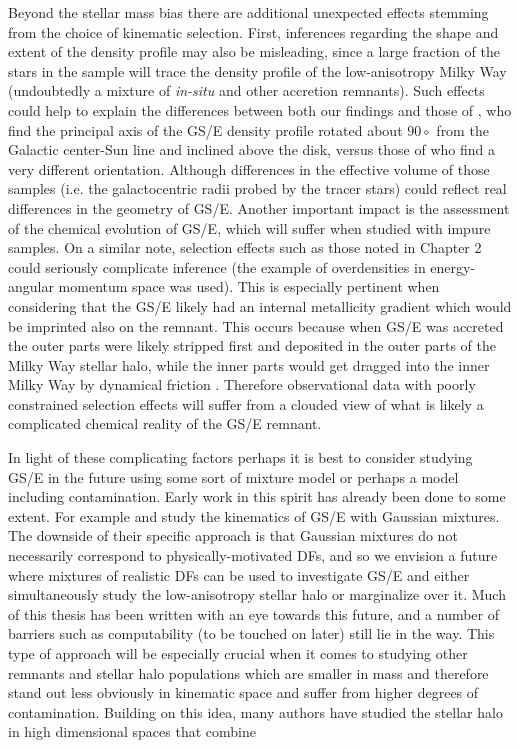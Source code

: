 Beyond the stellar mass bias there are additional unexpected effects stemming from the choice of kinematic selection. First, inferences regarding the shape and extent of the density profile may also be misleading, since a large fraction of the stars in the sample will trace the density profile of the low-anisotropy Milky Way (undoubtedly a mixture of \textit{in-situ} and other accretion remnants). Such effects could help to explain the differences between both our findings and those of \textcite{iorio19}, who find the principal axis of the GS/E density profile rotated about $90\circ$ from the Galactic center-Sun line and inclined above the disk, versus those of \textcite{han23} who find a very different orientation. Although differences in the effective volume of those samples (i.e. the galactocentric radii probed by the tracer stars) could reflect real differences in the geometry of GS/E. Another important impact is the assessment of the chemical evolution of GS/E, which will suffer when studied with impure samples. On a similar note, selection effects such as those noted in Chapter 2 could seriously complicate inference (the example of overdensities in energy-angular momentum space was used). This is especially pertinent when considering that the GS/E likely had an internal metallicity gradient which would be imprinted also on the remnant. This occurs because when GS/E was accreted the outer parts were likely stripped first and deposited in the outer parts of the Milky Way stellar halo, while the inner parts would get dragged into the inner Milky Way by dynamical friction \parencite[e.g. see ][]{amarante22}. Therefore observational data with poorly constrained selection effects will suffer from a clouded view of what is likely a complicated chemical reality of the GS/E remnant.

In light of these complicating factors perhaps it is best to consider studying GS/E in the future using some sort of mixture model or perhaps a model including contamination. Early work in this spirit has already been done to some extent. For example \textcite{lancaster19} and \textcite{iorio21} study the kinematics of GS/E with Gaussian mixtures. The downside of their specific approach is that Gaussian mixtures do not necessarily correspond to physically-motivated DFs, and so we envision a future where mixtures of realistic DFs can be used to investigate GS/E and either simultaneously study the low-anisotropy stellar halo or marginalize over it. Much of this thesis has been written with an eye towards this future, and a number of barriers such as computability (to be touched on later) still lie in the way. This type of approach will be especially crucial when it comes to studying other remnants and stellar halo populations which are smaller in mass and therefore stand out less obviously in kinematic space and suffer from higher degrees of contamination. Building on this idea, many authors have studied the stellar halo in high dimensional spaces that combine 

